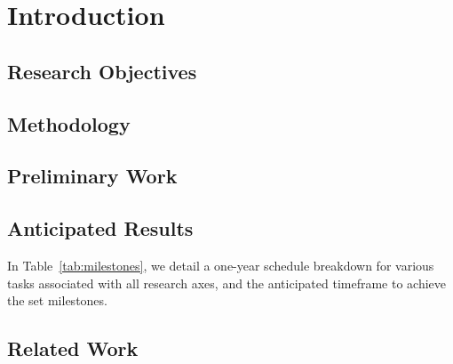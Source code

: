 \section{Introduction}


\subsection{Research Objectives}


\subsection{Methodology}


\subsection{Preliminary Work}


\subsection{Anticipated Results}
In Table~\ref{tab:milestones}, we detail a one-year schedule breakdown for various tasks associated with all research axes, and the anticipated timeframe to achieve the set milestones.


\subsection{Related Work}




